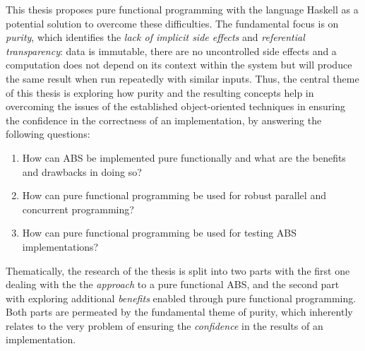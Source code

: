 \medskip

This thesis proposes pure functional programming with the language Haskell as a potential solution to overcome these difficulties. The fundamental focus is on \textit{purity}, which identifies the \textit{lack of implicit side effects} and \textit{referential transparency}: data is immutable, there are no uncontrolled side effects and a computation does not depend on its context within the system but will produce the same result when run repeatedly with similar inputs. Thus, the central theme of this thesis is exploring how purity and the resulting concepts help in overcoming the issues of the established object-oriented techniques in ensuring the confidence in the correctness of an implementation, by answering the following questions:

%
%

\begin{enumerate}
	\item How can ABS be implemented pure functionally and what are the benefits and drawbacks in doing so?
	\item How can pure functional programming be used for robust parallel and concurrent programming? 
	\item How can pure functional programming be used for testing ABS implementations?
\end{enumerate}

Thematically, the research of the thesis is split into two parts with the first one dealing with the the \textit{approach} to a pure functional ABS, and the second part with exploring additional \textit{benefits} enabled through pure functional programming. Both parts are permeated by the fundamental theme of purity, which inherently relates to the very problem of ensuring the \textit{confidence} in the results of an implementation. 

